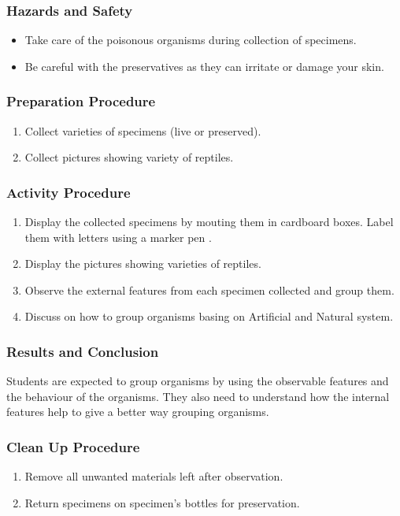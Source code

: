 \subsubsection*{Hazards and Safety}
\begin{itemize}
\item{Take care of the poisonous organisms during collection of specimens.}
\item{Be careful with the preservatives as they can irritate or damage your skin.}
\end{itemize}

\subsubsection*{Preparation Procedure}
\begin{enumerate}
\item{Collect varieties of specimens (live or preserved).}
\item{Collect pictures showing variety of reptiles.}
\end{enumerate}

\subsubsection*{Activity Procedure}
\begin{enumerate}
\item{Display the collected specimens by mouting them in cardboard boxes. Label them with letters using a marker pen .}
\item{Display the pictures showing varieties of reptiles.}
\item{Observe the external features from each specimen collected and group them.}
\item{Discuss on how to group organisms basing on Artificial and Natural system.}
\end{enumerate}

\subsubsection*{Results and Conclusion}
Students are expected to group organisms by using the observable features and the behaviour of the organisms. They also need to understand how the internal features help to give a better way grouping organisms.

\subsubsection*{Clean Up Procedure}
\begin{enumerate}
\item{Remove all unwanted materials left after observation.}
\item{Return specimens on specimen's bottles for preservation.}
\end{enumerate}

